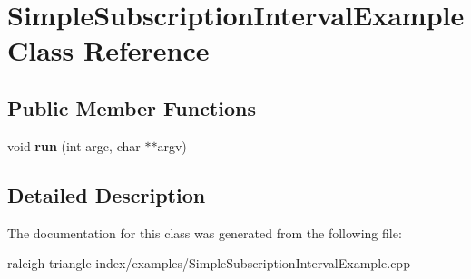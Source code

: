 \section{Simple\+Subscription\+Interval\+Example Class Reference}
\label{class_simple_subscription_interval_example}
\subsection*{Public Member Functions}
\begin{DoxyCompactItemize}
\item 
void {\bfseries run} (int argc, char $\ast$$\ast$argv)\label{class_simple_subscription_interval_example_a3087a2c52eb1f29d970dcc42c11d81ae}

\end{DoxyCompactItemize}


\subsection{Detailed Description}


The documentation for this class was generated from the following file\+:\begin{DoxyCompactItemize}
\item 
raleigh-\/triangle-\/index/examples/Simple\+Subscription\+Interval\+Example.\+cpp\end{DoxyCompactItemize}
